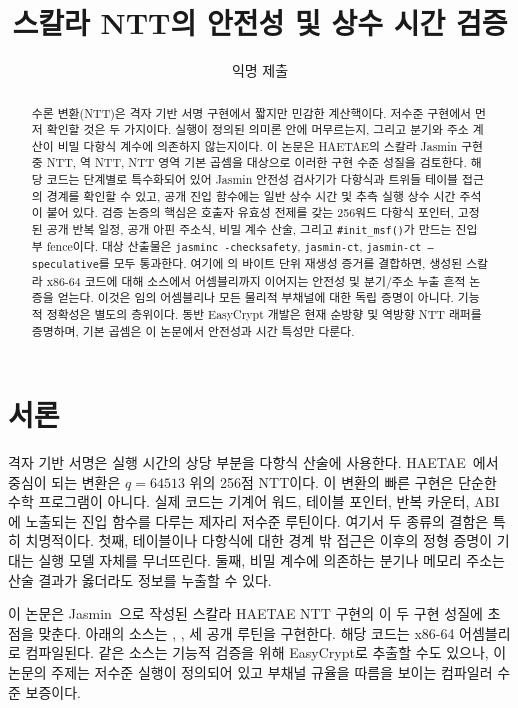 \documentclass[10pt,twocolumn]{article}
\title{\vspace{-0.8em}\haetae{} 스칼라 \jasmin{} NTT의 안전성 및 상수 시간 검증}
\author{익명 제출}
\date{}
\newcommand{\haetae}{HAETAE}
\newcommand{\jasmin}{Jasmin}
\newcommand{\ct}{상수 시간}
\newcommand{\sct}{추측 실행 상수 시간}
\begin{document}
\maketitle
\vspace{-1.1em}

\begin{abstract}
수론 변환(NTT)은 격자 기반 서명 구현에서 짧지만 민감한 계산핵이다.
저수준 구현에서 먼저 확인할 것은 두 가지이다. 실행이 정의된 의미론
안에 머무르는지, 그리고 분기와 주소 계산이 비밀 다항식 계수에 의존하지
않는지이다. 이 논문은 \haetae{}의 스칼라 \jasmin{} 구현 중 NTT,
역 NTT, NTT 영역 기본 곱셈을 대상으로 이러한 구현 수준 성질을
검토한다. 해당 코드는 단계별로 특수화되어 있어 \jasmin{} 안전성 검사기가
다항식과 트위들 테이블 접근의 경계를 확인할 수 있고, 공개 진입 함수에는
일반 \ct{} 및 \sct{} 주석이 붙어 있다. 검증 논증의 핵심은 호출자
유효성 전제를 갖는 256워드 다항식 포인터, 고정된 공개 반복 일정, 공개
아핀 주소식, 비밀 계수 산술, 그리고 \texttt{\#init\_msf()}가 만드는
진입부 fence이다. 대상 산출물은 \texttt{jasminc -checksafety},
\texttt{jasmin-ct}, \texttt{jasmin-ct --speculative}를 모두 통과한다.
여기에 의 바이트 단위 재생성 증거를 결합하면, 생성된
스칼라 x86-64 코드에 대해 소스에서 어셈블리까지 이어지는 안전성 및
분기/주소 누출 흔적 논증을 얻는다. 이것은 임의 어셈블리나 모든 물리적
부채널에 대한 독립 증명이 아니다. 기능적 정확성은 별도의 층위이다.
동반 EasyCrypt 개발은 현재 순방향 및 역방향 NTT 래퍼를 증명하며,
기본 곱셈은 이 논문에서 안전성과 시간 특성만 다룬다.
\end{abstract}

\section{서론}

격자 기반 서명은 실행 시간의 상당 부분을 다항식 산술에 사용한다.
\haetae{}~\cite{HAETAE2022}에서 중심이 되는 변환은
\(q=64513\) 위의 256점 NTT이다. 이 변환의 빠른 구현은 단순한 수학
프로그램이 아니다. 실제 코드는 기계어 워드, 테이블 포인터, 반복
카운터, ABI에 노출되는 진입 함수를 다루는 제자리 저수준 루틴이다.
여기서 두 종류의 결함은 특히 치명적이다. 첫째, 테이블이나 다항식에
대한 경계 밖 접근은 이후의 정형 증명이 기대는 실행 모델 자체를
무너뜨린다. 둘째, 비밀 계수에 의존하는 분기나 메모리 주소는 산술
결과가 옳더라도 정보를 누출할 수 있다.

이 논문은 \jasmin{}~\cite{Jasmin2017,LastMile2020,JasminFramework2026}으로 작성된 스칼라 \haetae{} NTT
구현의 이 두 구현 성질에 초점을 맞춘다.  아래의 소스는
, ,
 세 공개 루틴을 구현한다. 해당 코드는
x86-64 어셈블리 로 컴파일된다. 같은 소스는 기능적
검증을 위해 EasyCrypt로 추출할 수도 있으나, 이 논문의 주제는 저수준
실행이 정의되어 있고 부채널 규율을 따름을 보이는 컴파일러 수준
보증이다.
\end{document}
